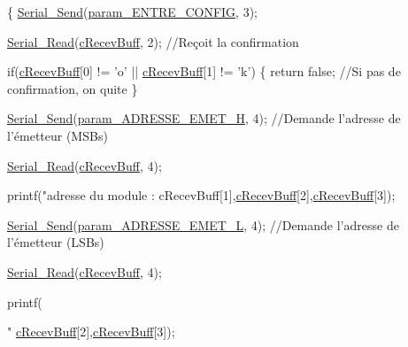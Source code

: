 \begin{DoxyCode}
\{
    \hyperlink{classUart_ace4b7eaee7374cac2c91ca627b2a78b6}{Serial\_Send}(\hyperlink{uart_8h_af89774268ea3d3837342a1698e105883}{param\_ENTRE\_CONFIG}, 3);

    \hyperlink{classUart_aba195c21510bc9bbab776b961d866e1e}{Serial\_Read}(\hyperlink{classUart_afe931bc10d90890bce0d9331edb99598}{cRecevBuff}, 2);      \textcolor{comment}{//Reçoit la
       confirmation}

    \textcolor{keywordflow}{if}(\hyperlink{classUart_afe931bc10d90890bce0d9331edb99598}{cRecevBuff}[0] != \textcolor{charliteral}{'o'} || \hyperlink{classUart_afe931bc10d90890bce0d9331edb99598}{cRecevBuff}[1] != \textcolor{charliteral}{'k'}) \{
        \textcolor{keywordflow}{return} \textcolor{keyword}{false};               \textcolor{comment}{//Si pas de confirmation, on quite}
    \}

    \hyperlink{classUart_ace4b7eaee7374cac2c91ca627b2a78b6}{Serial\_Send}(\hyperlink{uart_8h_a5eb04239c6384873a45b0c4f43aaa864}{param\_ADRESSE\_EMET\_H}, 4);       
            \textcolor{comment}{//Demande l'adresse de l'émetteur (MSBs)}

    \hyperlink{classUart_aba195c21510bc9bbab776b961d866e1e}{Serial\_Read}(\hyperlink{classUart_afe931bc10d90890bce0d9331edb99598}{cRecevBuff}, 4);

    printf(\textcolor{stringliteral}{"adresse du module : %
      cRecevBuff}[1],\hyperlink{classUart_afe931bc10d90890bce0d9331edb99598}{cRecevBuff}[2],\hyperlink{classUart_afe931bc10d90890bce0d9331edb99598}{cRecevBuff}[3]);

    \hyperlink{classUart_ace4b7eaee7374cac2c91ca627b2a78b6}{Serial\_Send}(\hyperlink{uart_8h_ac12bfbd9bb75329241513b728f667963}{param\_ADRESSE\_EMET\_L}, 4);       
            \textcolor{comment}{//Demande l'adresse de l'émetteur (LSBs)}

    \hyperlink{classUart_aba195c21510bc9bbab776b961d866e1e}{Serial\_Read}(\hyperlink{classUart_afe931bc10d90890bce0d9331edb99598}{cRecevBuff}, 4);

    printf(\textcolor{stringliteral}{"%
      \hyperlink{classUart_afe931bc10d90890bce0d9331edb99598}{cRecevBuff}[2],\hyperlink{classUart_afe931bc10d90890bce0d9331edb99598}{cRecevBuff}[3]);

}
\end{DoxyCode}
